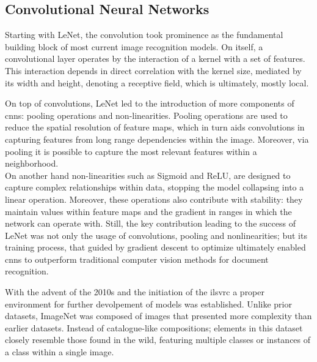 \subsection{Convolutional Neural Networks}
\label{rel:sub_cnn}
Starting with LeNet, the convolution took prominence as the fundamental building block 
of most current image recognition models. On itself, a convolutional layer operates by the 
interaction of a kernel with a set of features. This interaction depends in 
direct correlation with the kernel size, mediated by its width and height, denoting a receptive field,
which is ultimately, mostly local. 
%

\noindent On top of convolutions, LeNet led to the introduction of more components of \glspl{cnn}: 
pooling operations and non-linearities. Pooling operations are used to reduce the spatial 
resolution of feature maps, which in turn aids convolutions in capturing features from long 
range dependencies within the image. Moreover, via pooling it is possible to capture the most 
relevant features within a neighborhood.\\
On another hand non-linearities such as Sigmoid and ReLU, are designed to capture complex 
relationships within data, stopping the model collapsing into a linear operation. Moreover, these 
operations also contribute with stability: they maintain values within feature maps and the gradient 
in ranges in which the network can operate with. %
Still, the key contribution leading to the success of LeNet was not only the usage of 
convolutions, pooling and nonlinearities; but its training process, that guided by gradient descent 
to optimize ultimately enabled \glspl{cnn} to outperform traditional computer vision methods for 
document recognition. 



\noindent With the advent of the 2010s and the initiation of the \gls{ilsvrc} \autocite{ILSVRC15} 
a proper environment for further devolpement of models was established. Unlike prior datasets, 
ImageNet was composed of images that presented more complexity than earlier datasets. Instead 
of catalogue-like compositions; elements in this dataset closely resemble those found 
in the wild, featuring multiple classes or instances of a class within a single image.

